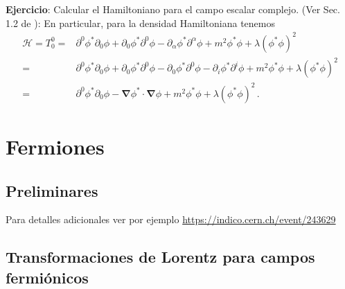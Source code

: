 \textbf{Ejercicio}: Calcular el Hamiltoniano para el campo escalar complejo. (Ver Sec. 1.2 de \cite{Greiner:1990tz}):
En particular, para la densidad Hamiltoniana tenemos
\begin{align}
 \mathcal{H}=  T^0_0 =&\partial^0\phi^* \partial_0 \phi + \partial_0 \phi^* \partial^0\phi-\partial_{\alpha}\phi^{*} \partial^{\alpha}\phi+m^2\phi^{*}\phi+\lambda \left(\phi^{*}\phi \right)^2 \nonumber\\
  =&\partial^0\phi^* \partial_0 \phi + \partial_0 \phi^* \partial^0\phi-\partial_{0}\phi^{*} \partial^{0}\phi-\partial_{i}\phi^{*} \partial^i\phi+m^2\phi^{*}\phi+\lambda \left(\phi^{*}\phi \right)^2 \nonumber\\
  =&\partial^0\phi^* \partial_0 \phi -\boldsymbol{\nabla}\phi^{*}\cdot\boldsymbol{\nabla}\phi+m^2\phi^{*}\phi+\lambda \left(\phi^{*}\phi \right)^2 \,.
\end{align}






\chapter{Fermiones}
\label{cha:fermiones} %

\section{Preliminares}

Para detalles adicionales ver por ejemplo \url{https://indico.cern.ch/event/243629}


\section{Transformaciones de Lorentz para campos fermiónicos}
\label{sec:transf-de-lorentz-1}

